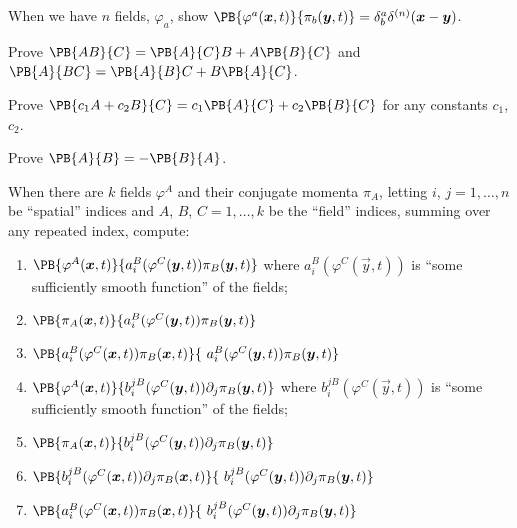\begin{exercise}
When we have $n$ fields, $\varphi_{a}$, show
$\PB{\varphi^{a}(\vec{x},t)}{\pi_{b}(\vec{y},t)}=\delta^{a}_{b}\delta^{(n)}(\vec{x}-\vec{y})$.
\end{exercise}

\begin{exercise}
Prove $\PB{AB}{C}=\PB{A}{C}B+A\PB{B}{C}$ and $\PB{A}{BC}=\PB{A}{B}C+B\PB{A}{C}$.
\end{exercise}

\begin{exercise}
Prove $\PB{c_{1}A+c_{2}B}{C}=c_{1}\PB{A}{C}+c_{2}\PB{B}{C}$ for any
constants $c_{1}$, $c_{2}$.
\end{exercise}

\begin{exercise}
Prove $\PB{A}{B}=-\PB{B}{A}$.
\end{exercise}


\begin{exercise}
When there are $k$ fields $\varphi^{A}$ and their conjugate momenta
$\pi_{A}$, letting $i$, $j=1,\dots,n$ be ``spatial'' indices and $A$,
$B$, $C=1,\dots,k$ be the ``field'' indices, summing over any repeated index, compute:
\begin{enumerate}
\item $\PB{\varphi^{A}(\vec{x},t)}{a_{i}^{B}(\varphi^{C}(\vec{y},t))\pi_{B}(\vec{y},t)}$
where $a_{i}^{B}(\varphi^{C}(\vec{y},t))$ is ``some sufficiently smooth function'' of the fields;
\item $\PB{\pi_{A}(\vec{x},t)}{a_{i}^{B}(\varphi^{C}(\vec{y},t))\pi_{B}(\vec{y},t)}$
\item $\PB{a_{i}^{B}(\varphi^{C}(\vec{x},t))\pi_{B}(\vec{x},t)}{~a_{i}^{B}(\varphi^{C}(\vec{y},t))\pi_{B}(\vec{y},t)}$
\item $\PB{\varphi^{A}(\vec{x},t)}{b_{i}^{jB}(\varphi^{C}(\vec{y},t))\partial_{j}\pi_{B}(\vec{y},t)}$
where $b_{i}^{jB}(\varphi^{C}(\vec{y},t))$ is ``some sufficiently smooth function'' of the fields;
\item $\PB{\pi_{A}(\vec{x},t)}{b_{i}^{jB}(\varphi^{C}(\vec{y},t))\partial_{j}\pi_{B}(\vec{y},t)}$
\item $\PB{b_{i}^{jB}(\varphi^{C}(\vec{x},t))\partial_{j}\pi_{B}(\vec{x},t)}{~b_{i}^{jB}(\varphi^{C}(\vec{y},t))\partial_{j}\pi_{B}(\vec{y},t)}$
\item $\PB{a_{i}^{B}(\varphi^{C}(\vec{x},t))\pi_{B}(\vec{x},t)}{~b_{i}^{jB}(\varphi^{C}(\vec{y},t))\partial_{j}\pi_{B}(\vec{y},t)}$
\end{enumerate}
\end{exercise}

